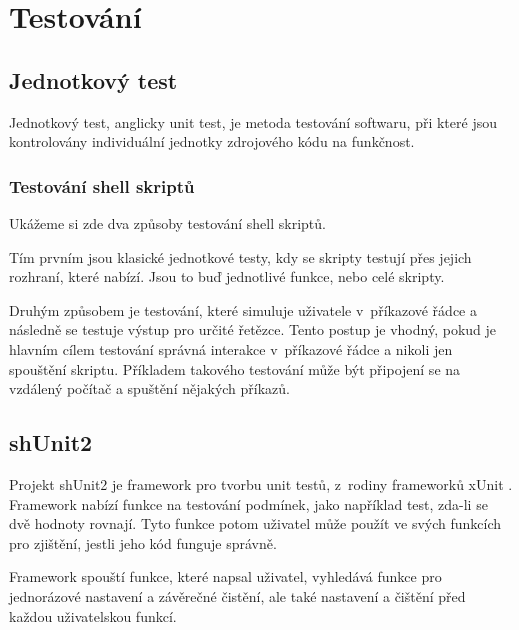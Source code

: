 \documentclass[thesis=M,czech]{FITthesis}[2012/06/26]
\begin{document}
%
%
\chapter{Testování}

%
\section{Jednotkový test}

Jednotkový test, anglicky unit test, je metoda testování softwaru, při které jsou kontrolovány individuální jednotky zdrojového kódu na funkčnost.

%
\subsection{Testování shell skriptů}

Ukážeme si zde dva způsoby testování shell skriptů.

Tím prvním jsou klasické jednotkové testy, kdy se skripty testují přes jejich rozhraní, které nabízí. Jsou to buď jednotlivé funkce, nebo celé skripty.

Druhým způsobem je testování, které simuluje uživatele v~příkazové řádce a následně se testuje výstup pro určité řetězce. Tento postup je vhodný, pokud je hlavním cílem testování správná interakce v~příkazové řádce a nikoli jen spouštění skriptu. Příkladem takového testování může být připojení se na vzdálený počítač a spuštění nějakých příkazů.



\section{shUnit2}

Projekt shUnit2 \cite{shunit2} je framework pro tvorbu unit testů, z~rodiny frameworků xUnit \cite{xunit}. Framework nabízí funkce na testování podmínek, jako například test, zda-li se dvě hodnoty rovnají. Tyto funkce potom uživatel může použít ve svých funkcích pro zjištění, jestli jeho kód funguje správně.

Framework spouští funkce, které napsal uživatel, vyhledává funkce pro jednorázové nastavení a závěrečné čistění, ale také nastavení a čištění před každou uživatelskou funkcí.
\end{document}
